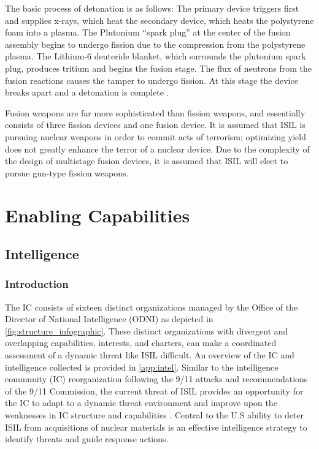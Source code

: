 \documentclass{report}
\begin{document}
The basic process of detonation is as follows: The primary device triggers first and supplies x-rays, which heat the secondary device, which heats the polystyrene foam into a plasma. The Plutonium “spark plug” at the center of the fusion assembly begins to undergo fission due to the compression from the polystyrene plasma. The Lithium-6 deuteride blanket, which surrounds the plutonium spark plug, produces tritium and begins the fusion stage. The flux of neutrons from the fusion reactions causes the  tamper to undergo fission. At this stage the device breaks apart and a detonation is complete \cite{Defense1998}. 

Fusion weapons are far more sophisticated than fission weapons, and essentially consists of three fission devices and one fusion device. It is assumed that ISIL is pursuing nuclear weapons in order to commit acts of terrorism; optimizing yield does not greatly enhance the terror of a nuclear device. Due to the complexity of the design of multistage fusion devices, it is assumed that ISIL will elect to pursue gun-type fission weapons. 






\chapter{Enabling Capabilities }

\section{Intelligence }

\subsection{Introduction}

The IC consists of sixteen distinct organizations managed by the Office of the Director of National Intelligence (ODNI) as depicted in \autoref{fig:structure_infographic}. These distinct organizations with divergent and overlapping capabilities, interests, and charters, can make a coordinated assessment of a dynamic threat like ISIL difficult. An overview of the IC and intelligence collected is provided in \autoref{app:intel}. Similar to the intelligence community (IC) reorganization following the 9/11 attacks and recommendations of the 9/11 Commission, the current threat of ISIL provides an opportunity for the IC to adapt to a dynamic threat environment and improve upon the weaknesses in IC structure and capabilities \cite{Kean2004}. Central to the U.S ability to deter ISIL from acquisitions of nuclear materials is an effective intelligence strategy to identify threats and guide response actions. 
\end{document}
